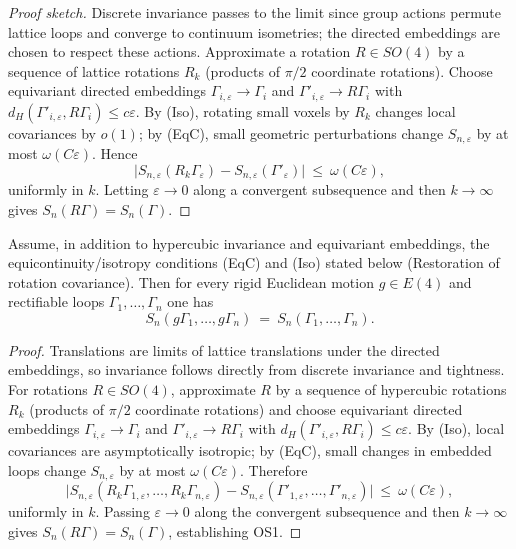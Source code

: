 \documentclass[11pt]{amsart}
\begin{document}
\begin{proof}[Proof sketch]
Discrete invariance passes to the limit since group actions permute lattice loops and converge to continuum isometries; the directed embeddings are chosen to respect these actions. Approximate a rotation $R\in SO(4)$ by a sequence of lattice rotations $R_k$ (products of $\pi/2$ coordinate rotations). Choose equivariant directed embeddings $\Gamma_{i,\varepsilon}\to\Gamma_i$ and $\Gamma'_{i,\varepsilon}\to R\Gamma_i$ with $d_H(\Gamma'_{i,\varepsilon},R\Gamma_i)\le c\varepsilon$. By (Iso), rotating small voxels by $R_k$ changes local covariances by $o(1)$; by (EqC), small geometric perturbations change $S_{n,\varepsilon}$ by at most $\omega(C\varepsilon)$. Hence
\[
  \bigl|S_{n,\varepsilon}(R_k\Gamma_{\varepsilon})-S_{n,\varepsilon}(\Gamma'_{\varepsilon})\bigr|\ \le\ \omega(C\varepsilon),
\]
uniformly in $k$. Letting $\varepsilon\to 0$ along a convergent subsequence and then $k\to\infty$ gives $S_n(R\Gamma)=S_n(\Gamma)$.
\end{proof}

\begin{corollary}
Assume, in addition to hypercubic invariance and equivariant embeddings, the equicontinuity/isotropy conditions (EqC) and (Iso) stated below (Restoration of rotation covariance). Then for every rigid Euclidean motion $g\in E(4)$ and rectifiable loops $\Gamma_1,\dots,\Gamma_n$ one has
\[
  S_n(g\Gamma_1,\dots,g\Gamma_n)\ =\ S_n(\Gamma_1,\dots,\Gamma_n).
\]
\end{corollary}

\begin{proof}
Translations are limits of lattice translations under the directed embeddings, so invariance follows directly from discrete invariance and tightness. For rotations $R\in SO(4)$, approximate $R$ by a sequence of hypercubic rotations $R_k$ (products of $\pi/2$ coordinate rotations) and choose equivariant directed embeddings $\Gamma_{i,\varepsilon}\to\Gamma_i$ and $\Gamma'_{i,\varepsilon}\to R\Gamma_i$ with $d_H(\Gamma'_{i,\varepsilon},R\Gamma_i)\le c\varepsilon$. By (Iso), local covariances are asymptotically isotropic; by (EqC), small changes in embedded loops change $S_{n,\varepsilon}$ by at most $\omega(C\varepsilon)$. Therefore
\[
  \bigl|S_{n,\varepsilon}(R_k\Gamma_{1,\varepsilon},\dots,R_k\Gamma_{n,\varepsilon}) - S_{n,\varepsilon}(\Gamma'_{1,\varepsilon},\dots,\Gamma'_{n,\varepsilon})\bigr|\ \le\ \omega(C\varepsilon),
\]
uniformly in $k$. Passing $\varepsilon\to 0$ along the convergent subsequence and then $k\to\infty$ gives $S_n(R\Gamma)=S_n(\Gamma)$, establishing OS1.
\end{proof}
\end{document}
